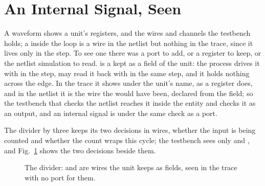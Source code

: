 \section{An Internal Signal, Seen}
\label{sec:x-wire}

A waveform shows a unit's registers, and the wires and channels the
testbench holds; a  inside the loop is a wire in the
netlist but nothing in the trace, since it lives only in the step. To
see one there was a port to add, or a register to keep, or the
netlist simulation to read.  is a  kept as a
field of the unit: the process drives it with  in the
step, may read it back with  in the same step, and it holds
nothing across the edge. In the trace it shows under the unit's name,
as a register does, and in the netlist it is the wire the 
would have been, declared from the field; so the testbench that
checks the netlist reaches it inside the entity and checks it as an
output, and an internal signal is under the same check as a port.

The divider by three keeps its two decisions in wires, whether the
input is being counted and whether the count wraps this cycle; the
testbench sees only  and , and
Fig.~\ref{fig:x-wire} shows the two decisions beside them.

\begin{figure}[htbp]
\centering

\caption{The divider:  and  are wires the
unit keeps as fields, seen in the trace with no port for them.}
\label{fig:x-wire}
\end{figure}




